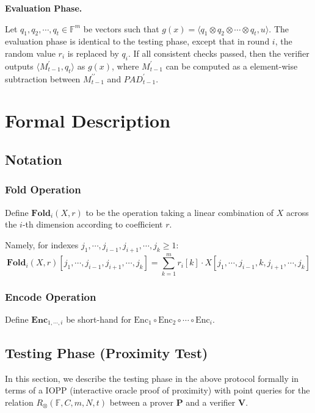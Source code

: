 \textbf{Evaluation Phase.}

Let $q_1, q_2, \cdots, q_t \in \mathbb{F}^{m}$ be vectors such that $g(x) =\langle q_1 \otimes q_2 \otimes \cdots \otimes q_t, u \rangle $. The evaluation phase is identical to the testing phase, except that in round $i$, the random value $r_i$ is replaced by $q_i$. If all consistent checks passed, then the verifier outputs $\langle M_{t-1}^{\prime}, q_t \rangle$ as $g(x)$, where $M_{t-1}^\prime$ can be computed as a element-wise subtraction between $M_{t-1}^{\prime\prime}$ and $PAD_{t-1}^\prime$.

\section{Formal Description}

\subsection{Notation}

\subsubsection{Fold Operation}

Define $\textbf{Fold}_i(X, r)$ to be the operation taking a linear combination of $X$ across the $i$-th dimension according to coefficient $r$. 

Namely, for indexes $j_1, \cdots, j_{i-1}, j_{i+1}, \cdots , j_{k} \ge 1$:
$$
\textbf{Fold}_i(X, r)[j_1, \cdots, j_{i-1}, j_{i+1}, \cdots , j_{k}] = \sum_{k=1}^{m} r_{i}[k] \cdot X[j_1, \cdots, j_{i-1}, k, j_{i+1}, \cdots , j_{k}]
$$

\subsubsection{Encode Operation}

Define $\textbf{Enc}_{1,\cdots,i}$ be short-hand for $\text{Enc}_1 \circ \text{Enc}_2 \circ \cdots \circ \text{Enc}_{i}$.

\subsection{Testing Phase (Proximity Test)}

In this section, we describe the testing phase in the above protocol formally in terms of a IOPP (interactive oracle proof of proximity) with point queries for the relation $R_\otimes(\mathbb{F}, C, m, N, t)$ between a prover $\textbf{P}$ and a verifier $\textbf{V}$.

